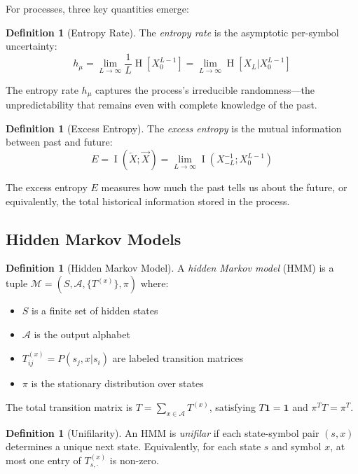 \documentclass[11pt,twocolumn]{article}
\theoremstyle{plain}
\theoremstyle{definition}
\newtheorem{definition}[theorem]{Definition}
\theoremstyle{remark}
\newcommand{\hmu}{h_\mu}
\newcommand{\calA}{\mathcal{A}}
\newcommand{\calM}{\mathcal{M}}
\newcommand{\Past}{\overleftarrow{X}}
\newcommand{\Future}{\overrightarrow{X}}
\DeclareMathOperator{\Ent}{H}
\DeclareMathOperator{\MI}{I}
\begin{document}
For processes, three key quantities emerge:

\begin{definition}[Entropy Rate]
The \emph{entropy rate} is the asymptotic per-symbol uncertainty:
\begin{equation}
    \hmu = \lim_{L \to \infty} \frac{1}{L} \Ent[X_0^{L-1}] = \lim_{L \to \infty} \Ent[X_L | X_0^{L-1}]
\end{equation}
\end{definition}

The entropy rate $\hmu$ captures the process's irreducible randomness---the unpredictability that remains even with complete knowledge of the past.

\begin{definition}[Excess Entropy]
The \emph{excess entropy} is the mutual information between past and future:
\begin{equation}
    E = \MI(\Past; \Future) = \lim_{L \to \infty} \MI(X_{-L}^{-1}; X_0^{L-1})
\end{equation}
\end{definition}

The excess entropy $E$ measures how much the past tells us about the future, or equivalently, the total historical information stored in the process.

\subsection{Hidden Markov Models}

\begin{definition}[Hidden Markov Model]
A \emph{hidden Markov model} (HMM) is a tuple $\calM = (S, \calA, \{T^{(x)}\}, \pi)$ where:
\begin{itemize}[nosep]
    \item $S$ is a finite set of hidden states
    \item $\calA$ is the output alphabet
    \item $T^{(x)}_{ij} = P(s_j, x | s_i)$ are labeled transition matrices
    \item $\pi$ is the stationary distribution over states
\end{itemize}
\end{definition}

The total transition matrix is $T = \sum_{x \in \calA} T^{(x)}$, satisfying $T\mathbf{1} = \mathbf{1}$ and $\pi^T T = \pi^T$.

\begin{definition}[Unifilarity]
An HMM is \emph{unifilar} if each state-symbol pair $(s, x)$ determines a unique next state. Equivalently, for each state $s$ and symbol $x$, at most one entry of $T^{(x)}_{s,\cdot}$ is non-zero.
\end{definition}
\end{document}
